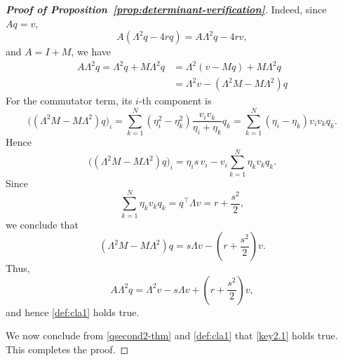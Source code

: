 \documentclass[11pt]{article}
\numberwithin{equation}{section}
\theoremstyle{definition}
\begin{document}
\begin{proof}[\normalfont\bfseries Proof of Proposition~\ref{prop:determinant-verification}]
Indeed, since $Aq=v$,
\[
A(\Lambda^2q-4rq)=A\Lambda^2q-4rv,
\]
 and $A=I+M$, we have
\[
\begin{aligned}
A\Lambda^2q=\Lambda^2q+M\Lambda^2q&=\Lambda^2(v-Mq)+M\Lambda^2q\\
&=\Lambda^2v-(\Lambda^2M-M\Lambda^2)q
\end{aligned}
\]
For the commutator term, its $i$-th component is
\[
\bigl((\Lambda^2M-M\Lambda^2)q\bigr)_i
=
\sum_{k=1}^N
(\eta_i^2-\eta_k^2)\frac{v_iv_k}{\eta_i+\eta_k}q_k
=
\sum_{k=1}^N
(\eta_i-\eta_k)v_iv_kq_k.
\]
Hence
\[
\bigl((\Lambda^2M-M\Lambda^2)q\bigr)_i
=
\eta_i s\,v_i-v_i\sum_{k=1}^N \eta_k v_k q_k.
\]
Since
\[
\sum_{k=1}^N \eta_k v_k q_k=q^\top \Lambda v=r+\frac{s^2}{2},
\]
we conclude that
\[
(\Lambda^2M-M\Lambda^2)q
=
s\Lambda v-\left(r+\frac{s^2}{2}\right)v.
\]
Thus,
\[
A\Lambda^2q
=
\Lambda^2v-s\Lambda v+\left(r+\frac{s^2}{2}\right)v,
\]
and hence \eqref{def:cla1} holds true.

We now conclude from \eqref{qsecond2-thm} and \eqref{def:cla1} that \eqref{key2.1} holds true. This completes the proof.
\end{proof}
\end{document}
